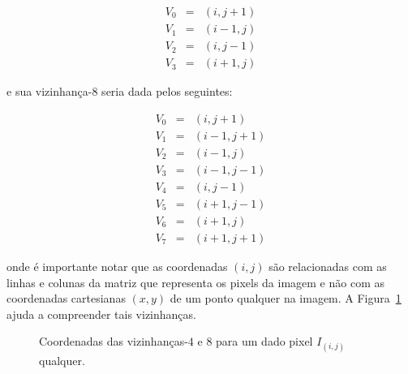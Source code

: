 \begin{eqnarray}
  V_0 & = & (i, j+1) \\
  V_1 & = & (i-1, j) \\
  V_2 & = & (i, j-1) \\
  V_3 & = & (i+1, j)
\end{eqnarray}

\noindent e sua vizinhança-8 seria dada pelos seguintes:

\begin{eqnarray}
  V_0 & = & (i, j+1) \\
  V_1 & = & (i-1, j+1) \\
  V_2 & = & (i-1, j) \\
  V_3 & = & (i-1, j-1) \\
  V_4 & = & (i, j-1) \\
  V_5 & = & (i+1, j-1) \\
  V_6 & = & (i+1, j) \\
  V_7 & = & (i+1, j+1)
\end{eqnarray}

\noindent onde é importante notar que as coordenadas $(i,j)$ são
relacionadas com as linhas e colunas da matriz que representa os
pixels da imagem e não com as coordenadas cartesianas $(x,y)$ de um
ponto qualquer na imagem. A Figura~\ref{fig:vizinhanca} ajuda a
compreender tais vizinhanças.

\begin{figure}[ht!]
\begin{center}

\hspace{2pc}

      \caption{Coordenadas das vizinhanças-$4$ e $8$ para um dado pixel
        $I_{(i,j)}$ qualquer.}
        \label{fig:vizinhanca}
\end{center}
\end{figure}

